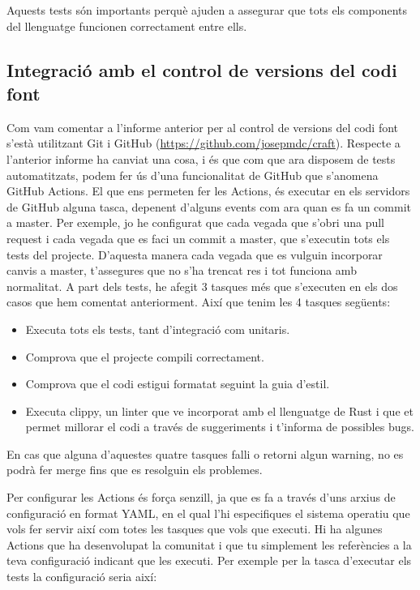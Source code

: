﻿\documentclass{article}
\begin{document}
Aquests tests són importants perquè ajuden a assegurar que tots els components
del llenguatge funcionen correctament entre ells.

\subsection{Integració amb el control de versions del codi font}

Com vam comentar a l'informe anterior per al control de versions del codi font
s'està utilitzant Git i GitHub (\url{https://github.com/josepmdc/craft}).
Respecte a l'anterior informe ha canviat una cosa, i és que com que ara disposem
de tests automatitzats, podem fer ús d'una funcionalitat de GitHub que s'anomena
GitHub Actions. El que ens permeten fer les Actions, és executar en els
servidors de GitHub alguna tasca, depenent d'alguns events com ara quan es fa un
commit a master. Per exemple, jo he configurat que cada vegada que s'obri una
pull request i cada vegada que es faci un commit a master, que s'executin tots
els tests del projecte. D'aquesta manera cada vegada que es vulguin incorporar
canvis a master, t'assegures que no s'ha trencat res i tot funciona amb
normalitat. A part dels tests, he afegit 3 tasques més que s'executen en els 
dos casos que hem comentat anteriorment. Així que tenim les 4 tasques següents:

\begin{itemize}
    \item Executa tots els tests, tant d'integració com unitaris.
    \item Comprova que el projecte compili correctament.
    \item Comprova que el codi estigui formatat seguint la guia d'estil.
    \item Executa clippy, un linter que ve incorporat amb el llenguatge de Rust 
        i que et permet millorar el codi a través de suggeriments i t'informa de
        possibles bugs.
\end{itemize}

En cas que alguna d'aquestes quatre tasques falli o retorni algun warning, 
no es podrà fer merge fins que es resolguin els problemes.

Per configurar les Actions és força senzill, ja que es fa a través d'uns arxius
de configuració en format YAML, en el qual l'hi especifiques el sistema operatiu
que vols fer servir així com totes les tasques que vols que executi. Hi ha 
algunes Actions que ha desenvolupat la comunitat i que tu simplement les 
referències a la teva configuració indicant que les executi. Per exemple per la
tasca d'executar els tests la configuració seria així:
\end{document}
